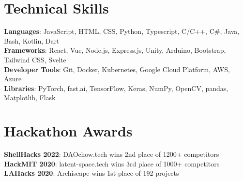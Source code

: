 \documentclass[letterpaper,11pt]{article}
\begin{document}
%
\section{Technical Skills}
\begin{itemize}[leftmargin=0.15in, label={}]
  \small{\item{
                \textbf{Languages}{: JavaScript, HTML, CSS, Python, Typescript, C/C++, C\#, Java, Bash, Kotlin, Dart} \\
                \textbf{Frameworks}{: React, Vue, Node.js, Express.js, Unity, Arduino, Bootstrap, Tailwind CSS, Svelte} \\
                \textbf{Developer Tools}{: Git, Docker, Kubernetes, Google Cloud Platform, AWS, Azure} \\
                \textbf{Libraries}{: PyTorch, fast.ai, TensorFlow, Keras, NumPy, OpenCV, pandas, Matplotlib, Flask} \\
          }}
\end{itemize}


\section{Hackathon Awards}
\begin{itemize}[leftmargin=0.15in, label={}]
  \small{\item{
                \textbf{ShellHacks 2022}{: DAOchow.tech wins 2nd place of 1200+ competitors} \\
                \textbf{HackMIT 2020}{: latent-space.tech wins 3rd place of 1000+ competitors} \\
                \textbf{LAHacks 2020}{: Archiscape wins 1st place of 192 projects} \\
          }}
\end{itemize}
\end{document}
